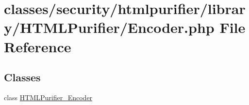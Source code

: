 \hypertarget{Encoder_8php}{\section{classes/security/htmlpurifier/library/\+H\+T\+M\+L\+Purifier/\+Encoder.php File Reference}
\label{Encoder_8php}
}
\subsection*{Classes}
\begin{DoxyCompactItemize}
\item 
class \hyperlink{classHTMLPurifier__Encoder}{H\+T\+M\+L\+Purifier\+\_\+\+Encoder}
\end{DoxyCompactItemize}
